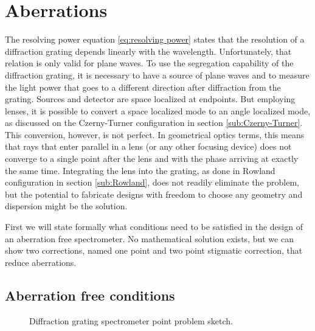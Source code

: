 \documentclass[12pt,twoside,english]{book}
\renewcommand{\~}{\perispomeni}%
\numberwithin{equation}{section}
\numberwithin{figure}{section}
\begin{document}
\section{Aberrations}
The resolving power equation \ref{eq:resolving power} states that the resolution of a diffraction grating depends linearly with the wavelength. Unfortunately, that relation is only valid for plane waves. To use the segregation capability of the diffraction grating, it is necessary to have a source of plane waves and to measure the light power that goes to a different direction after diffraction from the grating. Sources and detector are space localized at endpoints. But employing lenses, it is possible to convert a space localized mode to an angle localized mode, as discussed on the Czerny-Turner configuration in section \ref{sub:Czerny-Turner}. This conversion, however, is not perfect. In geometrical optics terms, this means that rays that enter parallel in a lens (or any other focusing device) does not converge to a single point after the lens and with the phase arriving at exactly the same time. Integrating the lens into the grating, as done in Rowland configuration in section \ref{sub:Rowland}, does not readily eliminate the problem, but the potential to fabricate designs with freedom to choose any geometry and dispersion might be the solution.

First we will state formally what conditions need to be satisfied in the design of an aberration free spectrometer. No mathematical solution exists, but we can show two corrections, named one point and two point stigmatic correction, that reduce aberrations. 

\subsection{Aberration free conditions}

%
\begin{figure}
\centering
\caption{Diffraction grating spectrometer point problem sketch.}
\label{fig:aberration free}
\end{figure}
\end{document}
